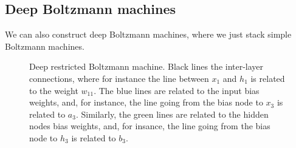 \subsection{Deep Boltzmann machines}
We can also construct deep Boltzmann machines, where we just stack simple Boltzmann machines. 
\begin{figure} [H]
	\centering
	
	\caption{Deep restricted Boltzmann machine. Black lines the inter-layer connections, where for instance the line between $x_1$ and $h_1$ is related to the weight $w_{11}$. The blue lines are related to the input bias weights, and, for instance, the line going from the bias node to $x_3$ is related to $a_3$. Similarly, the green lines are related to the hidden nodes bias weights, and, for insance, the line going from the bias node to $h_3$ is related to $b_3$.}
	\label{fig:restricted_boltzmann_machine}
\end{figure}
